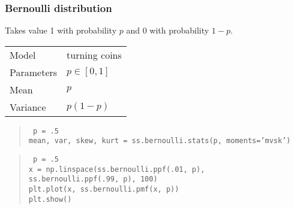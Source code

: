 \begin{frame}
  \frametitle{Bernoulli distribution}

  Takes value 1 with probability $p$ and 0 with probability $1-p$.
  \bigskip
  
  \begin{tabular}{l|l}
    Model & turning coins\\[1mm]
    Parameters & $p\in [0,1]$\\[1mm]
    Mean & $p$\\[1mm]
    Variance & $p(1-p)$
  \end{tabular}

  \vspace{6mm}
   {
    \begin{quote}
      \tt
      p = .5\\
      mean, var, skew, kurt = ss.bernoulli.stats(p, moments='mvsk')
    \end{quote}
    \cnote{ }
  }
   {
    \begin{quote}
      \tt
      p = .5\\
      x = np.linspace(ss.bernoulli.ppf(.01, p), \\
      \hspace{1cm}ss.bernoulli.ppf(.99, p), 100)\\
      plt.plot(x, ss.bernoulli.pmf(x, p))\\
      plt.show()
    \end{quote}

  }

  
  
\end{frame}

